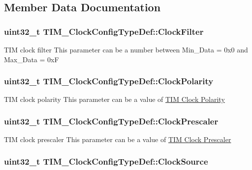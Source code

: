 \subsection{Member Data Documentation}
\hypertarget{struct_t_i_m___clock_config_type_def_adaf66568c766f75c4c661a872ca399e3}{
\subsubsection[{Clock\-Filter}]{\setlength{\rightskip}{0pt plus 5cm}uint32\-\_\-t T\-I\-M\-\_\-\-Clock\-Config\-Type\-Def\-::\-Clock\-Filter}}\label{struct_t_i_m___clock_config_type_def_adaf66568c766f75c4c661a872ca399e3}
T\-I\-M clock filter This parameter can be a number between Min\-\_\-\-Data = 0x0 and Max\-\_\-\-Data = 0x\-F \hypertarget{struct_t_i_m___clock_config_type_def_a66453fa8dc8a300267ff5aba08eff5c4}{
\subsubsection[{Clock\-Polarity}]{\setlength{\rightskip}{0pt plus 5cm}uint32\-\_\-t T\-I\-M\-\_\-\-Clock\-Config\-Type\-Def\-::\-Clock\-Polarity}}\label{struct_t_i_m___clock_config_type_def_a66453fa8dc8a300267ff5aba08eff5c4}
T\-I\-M clock polarity This parameter can be a value of \hyperlink{group___t_i_m___clock___polarity}{T\-I\-M Clock Polarity} \hypertarget{struct_t_i_m___clock_config_type_def_ae4c0cb6f58da0ec7b99f1c6411d2fee1}{
\subsubsection[{Clock\-Prescaler}]{\setlength{\rightskip}{0pt plus 5cm}uint32\-\_\-t T\-I\-M\-\_\-\-Clock\-Config\-Type\-Def\-::\-Clock\-Prescaler}}\label{struct_t_i_m___clock_config_type_def_ae4c0cb6f58da0ec7b99f1c6411d2fee1}
T\-I\-M clock prescaler This parameter can be a value of \hyperlink{group___t_i_m___clock___prescaler}{T\-I\-M Clock Prescaler} \hypertarget{struct_t_i_m___clock_config_type_def_a54c329013b5f6f87d1c3d2495fca84d2}{
\subsubsection[{Clock\-Source}]{\setlength{\rightskip}{0pt plus 5cm}uint32\-\_\-t T\-I\-M\-\_\-\-Clock\-Config\-Type\-Def\-::\-Clock\-Source}}\label{struct_t_i_m___clock_config_type_def_a54c329013b5f6f87d1c3d2495fca84d2}
